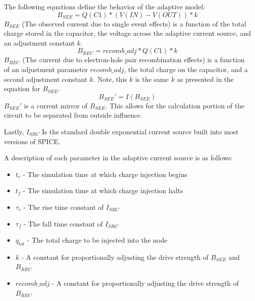 \documentclass[conference]{IEEEtran}
\begin{document}
    The following equations define the behavior of the adaptive model:
            {\large
    \[B_{SEE}=Q(C1)*(V(IN)-V(OUT))*k\]
    }
    \(B_{SEE}\) (The observed current due to single event effects) is a function of the total charge stored in the capacitor, the voltage across the adaptive current source, and an adjustment constant \(k\).
            {\large
    \[B_{REC}=recomb\_adj*Q(C1)*k\]
    }
    \(B_{REC}\) (The current due to electron-hole pair recombination effects) is a function of an adjustment parameter \(recomb\_adj\), the total charge on the capacitor, and a second adjustment constant \(k\).
    Note, this \(k\) is the same \(k\) as presented in the equation for \(B_{SEE}\).
            {\large
    \[B_{SEE}'=I(B_{SEE})\]
    }
    \(B_{SEE}'\) is a current mirror of \(B_{SEE}\).
    This allows for the calculation portion of the circuit to be separated from outside influence.

    Lastly, \(I_{SRC}\) Is the standard double exponential current source built into most versions of SPICE\@.

    A description of each parameter in the adaptive current source is as follows:

    \begin{itemize}

        \item[] \(t_r\) - The simulation time at which charge injection begins

        \item[] \(t_f\) - The simulation time at which charge injection halts

        \item[] \(\tau_r\) - The rise time constant of \(I_{SRC}\)

        \item[] \(\tau_f\) - The fall time constant of \(I_{SRC}\)

        \item[] \(q_{tot}\) - The total charge to be injected into the node

        \item[] \(k\) - A constant for proportionally adjusting the drive strength of \(B_{SEE}\) and \(B_{REC}\)

        \item[] \(recomb\_adj\) - A constant for proportionally adjusting the drive strength of \(B_{REC}\)

    \end{itemize}
    \vspace{1em}
\end{document}
